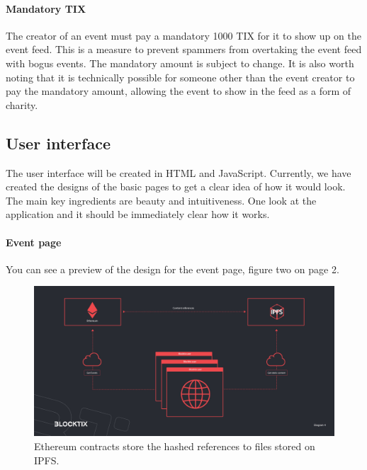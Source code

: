 \documentclass[a4paper]{article}
\begin{document}
\paragraph{Mandatory TIX} The creator of an event must pay a mandatory 1000 TIX for it to show up on the event feed. This is a measure to prevent spammers from overtaking the event feed with bogus events. The mandatory amount is subject to change. It is also worth noting that it is technically possible for someone other than the event creator to pay the mandatory amount, allowing the event to show in the feed as a form of charity.


\subsection{User interface}
The user interface will be created in HTML and JavaScript. Currently, we have created the designs of the basic pages to get a clear idea of how it would look. The main key ingredients are beauty and intuitiveness. One look at the application and it should be immediately clear how it works. 

\paragraph{Event page} You can see a preview of the design for the event page, figure two on page 2.


\begin{figure}
\centering
\includegraphics[scale=0.22]{BTX-Diagram-4.jpg}
\caption{\label{fig:BTX-Diagram-4}Ethereum contracts store the hashed references to files stored on IPFS.}
\end{figure}
\end{document}
